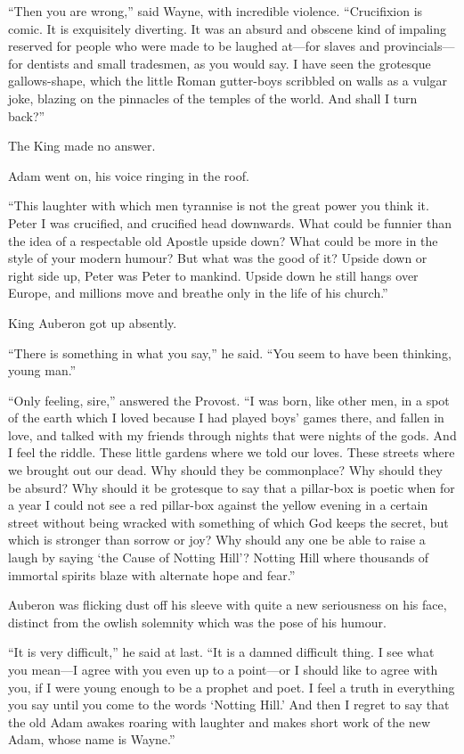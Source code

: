 \documentclass{book}
\begin{document}
“Then you are wrong,” said Wayne, with incredible violence. “Crucifixion is comic. It is exquisitely diverting. It was an absurd and obscene kind of impaling reserved for people who were made to be laughed at—for slaves and provincials—for dentists and small tradesmen, as you would say. I have seen the grotesque gallows-shape, which the little Roman gutter-boys scribbled on walls as a vulgar joke, blazing on the pinnacles of the temples of the world. And shall I turn back?”

The King made no answer.

Adam went on, his voice ringing in the roof.

“This laughter with which men tyrannise is not the great power you think it. Peter I was crucified, and crucified head downwards. What could be funnier than the idea of a respectable old Apostle upside down? What could be more in the style of your modern humour? But what was the good of it? Upside down or right side up, Peter was Peter to mankind. Upside down he still hangs over Europe, and millions move and breathe only in the life of his church.”

King Auberon got up absently.

“There is something in what you say,” he said. “You seem to have been thinking, young man.”

“Only feeling, sire,” answered the Provost. “I was born, like other men, in a spot of the earth which I loved because I had played boys’ games there, and fallen in love, and talked with my friends through nights that were nights of the gods. And I feel the riddle. These little gardens where we told our loves. These streets where we brought out our dead. Why should they be commonplace? Why should they be absurd? Why should it be grotesque to say that a pillar-box is poetic when for a year I could not see a red pillar-box against the yellow evening in a certain street without being wracked with something of which God keeps the secret, but which is stronger than sorrow or joy? Why should any one be able to raise a laugh by saying ‘the Cause of Notting Hill’? Notting Hill where thousands of immortal spirits blaze with alternate hope and fear.”

Auberon was flicking dust off his sleeve with quite a new seriousness on his face, distinct from the owlish solemnity which was the pose of his humour.

“It is very difficult,” he said at last. “It is a damned difficult thing. I see what you mean—I agree with you even up to a point—or I should like to agree with you, if I were young enough to be a prophet and poet. I feel a truth in everything you say until you come to the words ‘Notting Hill.’ And then I regret to say that the old Adam awakes roaring with laughter and makes short work of the new Adam, whose name is Wayne.”
\end{document}
